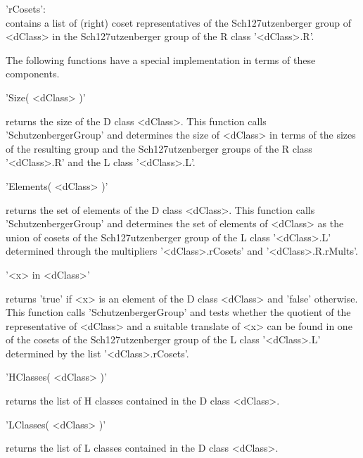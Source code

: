 'rCosets':\\
        contains  a   list  of  (right)  coset  representatives   of  the
        Sch\accent127utzenberger       group     of   <dClass>   in   the
        Sch\accent127utzenberger group of the R class '<dClass>.R'.


The  following functions have a  special implementation in terms of these
components.

\vspace{5mm}
'Size( <dClass> )'%

returns the   size of   the  D  class  <dClass>.   This   function  calls
'SchutzenbergerGroup' and determines the size of <dClass> in terms of the
sizes  of the resulting  group and the Sch\accent127utzenberger groups of
the R class '<dClass>.R' and the L class '<dClass>.L'.

\vspace{5mm}
'Elements( <dClass> )'%

returns the set of elements of the D class <dClass>.  This function calls
'SchutzenbergerGroup'  and determines the set of  elements of <dClass> as
the union of cosets of the Sch\accent127utzenberger  group of the L class
'<dClass>.L'  determined  through  the multipliers '<dClass>.rCosets' and
'<dClass>.R.rMults'.

\vspace{5mm}
'<x> in <dClass>'%
%

returns 'true' if  <x> is an element of  the D class <dClass> and 'false'
otherwise.  This function  calls 'SchutzenbergerGroup'  and tests whether
the quotient  of the representative  of <dClass> and a suitable translate
of <x> can be found in one  of the cosets of the Sch\accent127utzenberger
group   of  the   L   class   '<dClass>.L'   determined   by    the  list
'<dClass>.rCosets'.

\vspace{5mm}
'HClasses( <dClass> )'

returns the list of H classes contained in the D class <dClass>.

\vspace{5mm}
'LClasses( <dClass> )'

returns the list of L classes contained in the D class <dClass>.


